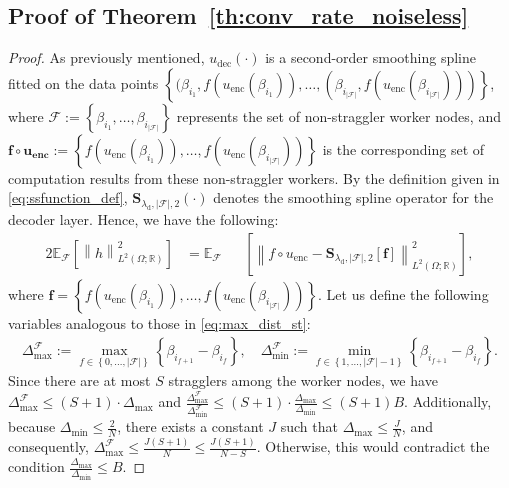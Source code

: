 \documentclass{article}
\def\encs{u_\textrm{enc}}
\def\decs{u_\textrm{dec}}
\def\declamb{\lambda_\textrm{d}}
\def\stset{\mathcal{F}}
\newcommand{\norm}[1]{\left\lVert#1\right\rVert}
\newcommand{\lp}[1]{{L}^{#1}\left(\Omega; \mathbb{R}\right)}
\newcommand{\splineCC}{\mathbf{S}_{\declamb,|\stset|,2}}
\begin{document}
\subsection{Proof of Theorem~\ref{th:conv_rate_noiseless}}\label{app:proof_noiseless}
\begin{proof}
As previously mentioned, $\decs(\cdot)$ is a second-order smoothing spline fitted on the data points $\left\{(\beta_{i_1}, f(\encs(\beta_{i_1})), \dots, (\beta_{i_{|\stset|}}, f(\encs(\beta_{i_{|\stset|}}))) \right\}$, where $\stset := \left\{\beta_{i_1}, \dots, \beta_{i_{|\stset|}} \right\}$ represents the set of non-straggler worker nodes, and $\bm{f \circ \encs} := \left\{f(\encs(\beta_{i_1})), \dots, f(\encs(\beta_{i_{|\stset|}})) \right\}$ is the corresponding set of computation results from these non-straggler workers. By the definition given in \eqref{eq:ssfunction_def}, $\splineCC(\cdot)$ denotes the smoothing spline operator for the decoder layer. Hence, we have the following:
\begin{alignat}{2}
    \mathbb{E}_{ \stset}\left[\norm{h}^2_{\lp{2}}\right] &= \mathbb{E}_{\stset}&&\left[\norm{f\circ\encs - \splineCC[\mathbf{f}]}^2_{\lp{2}}\right],
\end{alignat}
where $\mathbf{f}=\left\{f(\encs(\beta_{i_1})),\dots,f(\encs(\beta_{i_{|\stset|}}))\right\}$. Let us define the following variables analogous to those in \eqref{eq:max_dist_st}:
\begin{align}\label{eq:delta_max_stset}
\Delta^\stset_\textrm{max}:=\underset{f \in \left\{0,\dots,|\stset|\right\}}{\max} \left\{\beta_{i_{f+1}}-\beta_{i_f}\right\}, \quad \Delta^\stset_\textrm{min}:=\underset{f \in \left\{1,\dots,|\stset|-1\right\}}{\min} \left\{\beta_{i_{f+1}}-\beta_{i_f}\right\}.
\end{align}
Since there are at most $S$ stragglers among the worker nodes, we have $\Delta^\stset_\textrm{max} \leqslant (S+1) \cdot \Delta_\textrm{max}$ and $ \frac{\Delta^\stset_\textrm{max}}{\Delta^\stset_\textrm{min}} \leqslant (S+1)\cdot\frac{\Delta_\textrm{max}}{\Delta_\textrm{min}} \leqslant (S+1)B$. Additionally, because $\Delta_\textrm{min} \leqslant \frac{2}{N}$, there exists a constant $J$ such that $\Delta_\textrm{max} \leqslant \frac{J}{N}$, and consequently, $\Delta^\stset_\textrm{max} \leqslant \frac{J(S+1)}{N} \leqslant \frac{J(S+1)}{N-S}$. Otherwise, this would contradict the condition $\frac{\Delta_\textrm{max}}{\Delta_\textrm{min}} \leqslant B$.


\end{proof}
\end{document}

